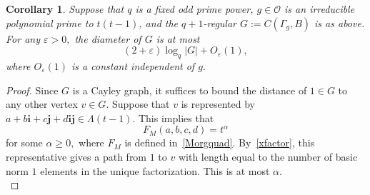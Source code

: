 \documentclass[10pt]{amsart}
\theoremstyle{plain}
\theoremstyle{plain}
\newtheorem{corollary}[theorem]{Corollary}
\theoremstyle{remark}
\theoremstyle{definition}
\begin{document}
\begin{corollary}\label{graphoptimal} Suppose that $q$ is a fixed odd prime power, $g\in\mathcal{O}$ is an irreducible polynomial prime to $t(t-1)$, and the $q+1$-regular $G:=C(\Gamma_g,B)$ is as above. For any $\varepsilon >0,$
the diameter of $G$ is at most
\[(2+\varepsilon)\log_{q}|G|+O_{\varepsilon}(1),\]
where  $O_{\varepsilon}(1)$ is a constant independent of $g.$
\end{corollary}
\begin{proof}Since $G$ is a Cayley graph, it suffices to bound the distance of $1\in G$ to any other vertex $v\in G.$  Suppose that $v$ is represented by 
$a+b\mathbf{i}+c\mathbf{j}+d\mathbf{ij}\in\Lambda(t-1).$ This implies that 
\[F_M(a,b,c,d)=t^{\alpha}\]
for some $\alpha\geq 0,$ where $F_M$ is defined in~\eqref{Morgquad}. By~\eqref{xfactor}, this representative gives a path from $1$ to $v$ with length equal to the number of basic norm $1$ elements in the unique factorization. This is at most $\alpha$. 
\\


\end{proof}
\end{document}
